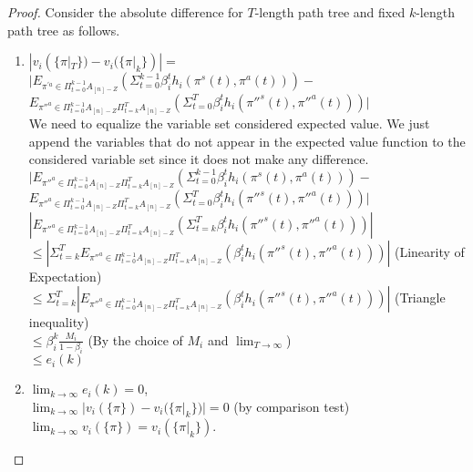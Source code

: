 		
		\begin{proof}
			Consider the absolute difference for $T$-length path tree and fixed $k$-length path tree as follows.
			\begin{enumerate}
				\item 	$|v_i(\{\pi|_T\})-v_i(\{\pi|_k\})| =$\\
				$| E_{\pi^{'a} \in \Pi_{t=0}^{k-1} A_{[n]-Z}}(\Sigma_{t=0}^{k-1} \beta_i^{t}h_{i}(\pi^{s}(t),\pi^{a}(t))) -$\newline
				$ E_{\pi''^{a} \in \Pi_{t=0}^{k-1} A_{[n]-Z} \Pi_{t=k}^{T} A_{[n]-Z}}(\Sigma_{t=0}^{T} \beta_i^{t}h_{i}(\pi''^{s}(t),\pi''^{a}(t)))|$\\
				\newline
				We need to equalize the variable set considered expected value. We just append the variables that do not appear in the expected value function to the considered variable set since it does not make any difference. \newline \newline
				$| E_{\pi''^{a} \in \Pi_{t=0}^{k-1} A_{[n]-Z} \Pi_{t=k}^{T} A_{[n]-Z}}(\Sigma_{t=0}^{k-1} \beta_i^{t}h_{i}(\pi^{s}(t),\pi^{a}(t)))-$\newline
				$ E_{\pi''^{a} \in \Pi_{t=0}^{k-1} A_{[n]-Z} \Pi_{t=k}^{T} A_{[n]-Z}}(\Sigma_{t=0}^{T} \beta_i^{t}h_{i}(\pi''^{s}(t),\pi''^{a}(t)))|$\\
				$ |E_{\pi''^{a} \in \Pi_{t=0}^{k-1} A_{[n]-Z} \Pi_{t=k}^{T} A_{[n]-Z}}(\Sigma_{t=k}^{T} \beta_i^{t}h_{i}(\pi''^{s}(t),\pi''^{a}(t)))|$\\
				$\leq |\Sigma_{t=k}^{T} E_{\pi''^{a} \in \Pi_{t=0}^{k-1} A_{[n]-Z} \Pi_{t=k}^{T} A_{[n]-Z}}( \beta_i^{t}h_{i}(\pi''^{s}(t),\pi''^{a}(t)))| $ (Linearity of Expectation)\\
				$\leq \Sigma_{t=k}^{T}| E_{\pi''^{a} \in \Pi_{t=0}^{k-1} A_{[n]-Z} \Pi_{t=k}^{T} A_{[n]-Z}}( \beta_i^{t}h_{i}(\pi''^{s}(t),\pi''^{a}(t)))| $ (Triangle inequality)\\
				$\le \beta_i^{k}\frac{M_i}{1-\beta_i}$ (By the choice of $M_i$ and $\lim_{T\to\infty}$)\\
				$\leq e_i(k)$
				\item $\lim_{k\to\infty} e_i(k)=0$,\\
				$\lim_{k\to\infty} |v_i(\{\pi\})-v_i(\{\pi|_k\})| = 0$ (by comparison test)\\
				$\lim_{k\to\infty} v_i(\{\pi\})=v_i(\{\pi|_k\})$.
				\end{enumerate}
				\end{proof}
				
